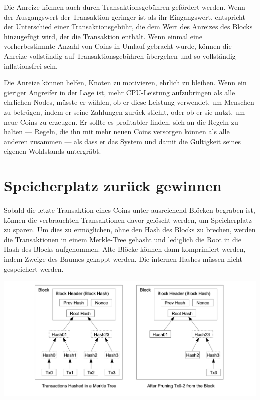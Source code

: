 \documentclass[10pt]{article}
\begin{document}
	Die Anreize können auch durch Transaktionsgebühren gefördert werden. Wenn der Ausgangswert der Transaktion geringer ist als ihr Eingangswert, entspricht der Unterschied einer Transaktionsgebühr, die dem Wert des Anreizes des Blocks hinzugefügt wird, der die Transaktion enthält. Wenn einmal eine vorherbestimmte Anzahl von Coins in Umlauf gebracht wurde, können die Anreize vollständig auf Transaktionsgebühren übergehen und so vollständig inflationsfrei sein.

	Die Anreize können helfen, Knoten zu motivieren, ehrlich zu bleiben. Wenn ein gieriger Angreifer in der Lage ist, mehr CPU-Leistung aufzubringen als alle ehrlichen Nodes, müsste er wählen, ob er diese Leistung verwendet, um Menschen zu betrügen, indem er seine Zahlungen zurück stiehlt, oder ob er sie nutzt, um neue Coins zu erzeugen. Er sollte es profitabler finden, sich an die Regeln zu halten — Regeln, die ihn mit mehr neuen Coins versorgen können als alle anderen zusammen — als dass er das System und damit die Gültigkeit seines eigenen Wohlstands untergräbt.

	\section{Speicherplatz zurück gewinnen}
	
	Sobald die letzte Transaktion eines Coins unter ausreichend Blöcken begraben ist, können die verbrauchten Transaktionen davor gelöscht werden, um Speicherplatz zu sparen. Um dies zu ermöglichen, ohne den Hash des Blocks zu brechen, werden die Transaktionen in einem Merkle-Tree \cite{merkle}\cite{massias}\cite{haber2} gehasht und lediglich die Root in die Hash des Blocks aufgenommen. Alte Blöcke können dann komprimiert werden, indem Zweige des Baumes gekappt werden. Die internen Hashes müssen nicht gespeichert werden.
	
	\begin{center}
		\includegraphics[scale=0.3]{pics/reclaimingdiskspace.png}
	\end{center}
	
\end{document}
